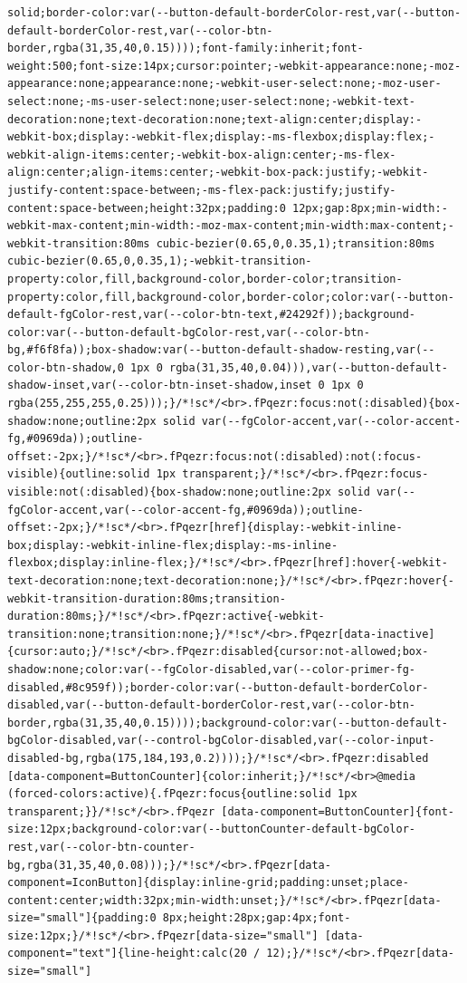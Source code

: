 \documentclass[
  letterpaper,
]{book}
\begin{document}
\begin{verbatim}
solid;border-color:var(--button-default-borderColor-rest,var(--button-default-borderColor-rest,var(--color-btn-border,rgba(31,35,40,0.15))));font-family:inherit;font-weight:500;font-size:14px;cursor:pointer;-webkit-appearance:none;-moz-appearance:none;appearance:none;-webkit-user-select:none;-moz-user-select:none;-ms-user-select:none;user-select:none;-webkit-text-decoration:none;text-decoration:none;text-align:center;display:-webkit-box;display:-webkit-flex;display:-ms-flexbox;display:flex;-webkit-align-items:center;-webkit-box-align:center;-ms-flex-align:center;align-items:center;-webkit-box-pack:justify;-webkit-justify-content:space-between;-ms-flex-pack:justify;justify-content:space-between;height:32px;padding:0 12px;gap:8px;min-width:-webkit-max-content;min-width:-moz-max-content;min-width:max-content;-webkit-transition:80ms cubic-bezier(0.65,0,0.35,1);transition:80ms cubic-bezier(0.65,0,0.35,1);-webkit-transition-property:color,fill,background-color,border-color;transition-property:color,fill,background-color,border-color;color:var(--button-default-fgColor-rest,var(--color-btn-text,#24292f));background-color:var(--button-default-bgColor-rest,var(--color-btn-bg,#f6f8fa));box-shadow:var(--button-default-shadow-resting,var(--color-btn-shadow,0 1px 0 rgba(31,35,40,0.04))),var(--button-default-shadow-inset,var(--color-btn-inset-shadow,inset 0 1px 0 rgba(255,255,255,0.25)));}/*!sc*/<br>.fPqezr:focus:not(:disabled){box-shadow:none;outline:2px solid var(--fgColor-accent,var(--color-accent-fg,#0969da));outline-offset:-2px;}/*!sc*/<br>.fPqezr:focus:not(:disabled):not(:focus-visible){outline:solid 1px transparent;}/*!sc*/<br>.fPqezr:focus-visible:not(:disabled){box-shadow:none;outline:2px solid var(--fgColor-accent,var(--color-accent-fg,#0969da));outline-offset:-2px;}/*!sc*/<br>.fPqezr[href]{display:-webkit-inline-box;display:-webkit-inline-flex;display:-ms-inline-flexbox;display:inline-flex;}/*!sc*/<br>.fPqezr[href]:hover{-webkit-text-decoration:none;text-decoration:none;}/*!sc*/<br>.fPqezr:hover{-webkit-transition-duration:80ms;transition-duration:80ms;}/*!sc*/<br>.fPqezr:active{-webkit-transition:none;transition:none;}/*!sc*/<br>.fPqezr[data-inactive]{cursor:auto;}/*!sc*/<br>.fPqezr:disabled{cursor:not-allowed;box-shadow:none;color:var(--fgColor-disabled,var(--color-primer-fg-disabled,#8c959f));border-color:var(--button-default-borderColor-disabled,var(--button-default-borderColor-rest,var(--color-btn-border,rgba(31,35,40,0.15))));background-color:var(--button-default-bgColor-disabled,var(--control-bgColor-disabled,var(--color-input-disabled-bg,rgba(175,184,193,0.2))));}/*!sc*/<br>.fPqezr:disabled [data-component=ButtonCounter]{color:inherit;}/*!sc*/<br>@media (forced-colors:active){.fPqezr:focus{outline:solid 1px transparent;}}/*!sc*/<br>.fPqezr [data-component=ButtonCounter]{font-size:12px;background-color:var(--buttonCounter-default-bgColor-rest,var(--color-btn-counter-bg,rgba(31,35,40,0.08)));}/*!sc*/<br>.fPqezr[data-component=IconButton]{display:inline-grid;padding:unset;place-content:center;width:32px;min-width:unset;}/*!sc*/<br>.fPqezr[data-size="small"]{padding:0 8px;height:28px;gap:4px;font-size:12px;}/*!sc*/<br>.fPqezr[data-size="small"] [data-component="text"]{line-height:calc(20 / 12);}/*!sc*/<br>.fPqezr[data-size="small"] 
\end{verbatim}
\end{document}
